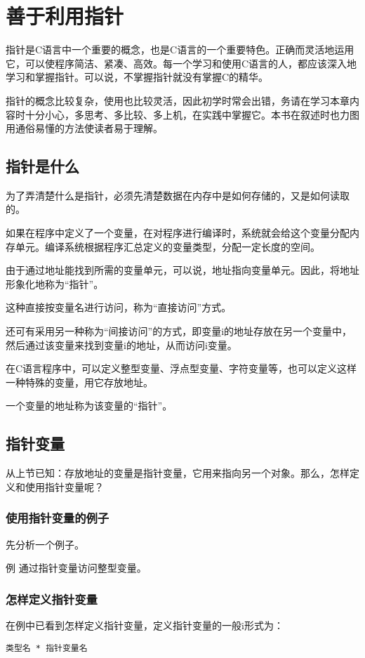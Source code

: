 \chapter{善于利用指针}
指针是C语言中一个重要的概念，也是C语言的一个重要特色。正确而灵活地运用它，可以使程序简洁、紧凑、高效。每一个学习和使用C语言的人，都应该深入地学习和掌握指针。可以说，不掌握指针就没有掌握C的精华。

指针的概念比较复杂，使用也比较灵活，因此初学时常会出错，务请在学习本章内容时十分小心，多思考、多比较、多上机，在实践中掌握它。本书在叙述时也力图用通俗易懂的方法使读者易于理解。
\section{指针是什么}
为了弄清楚什么是指针，必须先清楚数据在内存中是如何存储的，又是如何读取的。

如果在程序中定义了一个变量，在对程序进行编译时，系统就会给这个变量分配内存单元。编译系统根据程序汇总定义的变量类型，分配一定长度的空间。

由于通过地址能找到所需的变量单元，可以说，地址指向变量单元。因此，将地址形象化地称为“指针”。

这种直接按变量名进行访问，称为“直接访问”方式。

还可有采用另一种称为“间接访问”的方式，即变量i的地址存放在另一个变量中，然后通过该变量来找到变量i的地址，从而访问i变量。

在C语言程序中，可以定义整型变量、浮点型变量、字符变量等，也可以定义这样一种特殊的变量，用它存放地址。

一个变量的地址称为该变量的“指针”。
\section{指针变量}
从上节已知：存放地址的变量是指针变量，它用来指向另一个对象。那么，怎样定义和使用指针变量呢？
\subsection{使用指针变量的例子}
先分析一个例子。

例 通过指针变量访问整型变量。
\subsection{怎样定义指针变量}
在例中已看到怎样定义指针变量，定义指针变量的一般i形式为：
\begin{lstlisting}
类型名 * 指针变量名
\end{lstlisting}

